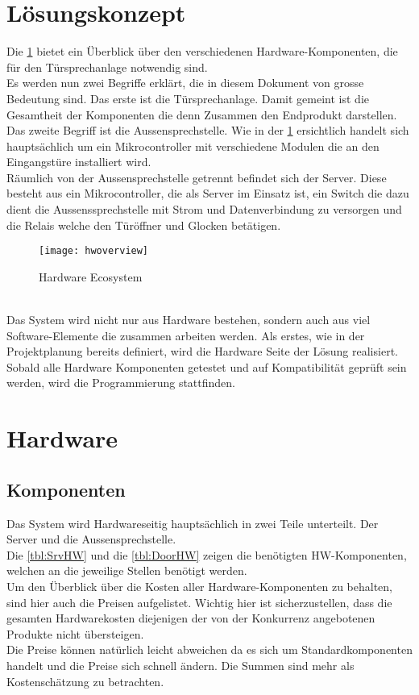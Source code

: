 \section{Lösungskonzept}
\label{sec:lösungskonzept}
Die \cref{fig:hwoverview} bietet ein Überblick über den verschiedenen Hardware-Komponenten, die für den Türsprechanlage notwendig sind. 
\\
Es werden nun zwei Begriffe erklärt, die in diesem Dokument von grosse Bedeutung sind. Das erste ist die Türsprechanlage. Damit gemeint ist die Gesamtheit der Komponenten die denn Zusammen den Endprodukt darstellen.
\\
Das zweite Begriff ist die Aussensprechstelle. Wie in der \cref{fig:hwoverview} ersichtlich handelt sich hauptsächlich um ein Mikrocontroller mit verschiedene Modulen die an den Eingangstüre installiert wird.
\\
Räumlich von der Aussensprechstelle getrennt befindet sich der Server. Diese besteht aus ein Mikrocontroller, die als Server im Einsatz ist, ein Switch die dazu dient die Aussenssprechstelle mit Strom und Datenverbindung zu versorgen und die Relais welche den Türöffner und Glocken betätigen.
\begin{figure}[htb!]
	\begin{center}
		\texttt{[image: hwoverview]}
		\caption[Hardware Ecosystem]{Hardware Ecosystem}
		\label{fig:hwoverview}
	\end{center}
\end{figure}
\\
Das System wird nicht nur aus Hardware bestehen, sondern auch aus viel Software-Elemente die zusammen arbeiten werden. Als erstes, wie in der Projektplanung bereits definiert, wird die Hardware Seite der Lösung realisiert. Sobald alle Hardware Komponenten getestet und auf Kompatibilität geprüft sein werden, wird die Programmierung stattfinden.

\section{Hardware}
\label{sec:chapterexample}
\subsection{Komponenten}
Das System wird Hardwareseitig hauptsächlich in zwei Teile unterteilt. Der Server und die Aussensprechstelle.
\\
Die \cref{tbl:SrvHW} und die \cref{tbl:DoorHW} zeigen die benötigten HW-Komponenten, welchen an die jeweilige Stellen benötigt werden.
\\
Um den Überblick über die Kosten aller Hardware-Komponenten zu behalten, sind hier auch die Preisen aufgelistet. Wichtig hier ist sicherzustellen, dass die gesamten Hardwarekosten diejenigen der von der Konkurrenz angebotenen Produkte nicht übersteigen.
\\
Die Preise können natürlich leicht abweichen da es sich um Standardkomponenten handelt und die Preise sich schnell ändern. Die Summen sind mehr als Kostenschätzung zu betrachten.

